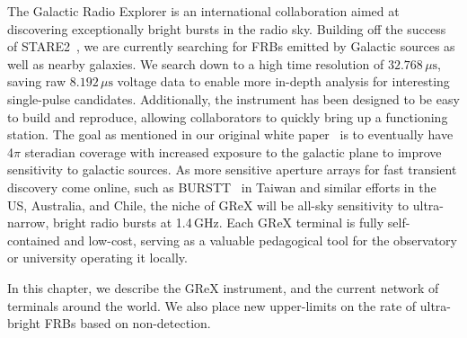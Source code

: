 The Galactic Radio Explorer is an international collaboration aimed at discovering exceptionally bright bursts in the radio sky.
Building off the success of STARE2~\cite{bochenekSTARE2DetectingFast2020}, we are currently searching for FRBs emitted by Galactic sources as well as nearby galaxies.
We search down to a high time resolution of $32.768\,\mu\text{s}$, saving raw $8.192\,\mu\text{s}$ voltage data to enable more in-depth analysis for interesting single-pulse candidates.
Additionally, the instrument has been designed to be easy to build and reproduce, allowing collaborators to quickly bring up a functioning station.
The goal as mentioned in our original white paper~\cite{connorGalacticRadioExplorer2021a} is to eventually have 4$\pi$ steradian coverage with increased exposure to the galactic plane to improve sensitivity to galactic sources.
As more sensitive aperture arrays for fast transient discovery come online, such as BURSTT~\cite{linBURSTTBustlingUniverse2022} in Taiwan and similar efforts in the US, Australia, and Chile, the niche of GReX will be all-sky 
sensitivity to ultra-narrow, bright radio bursts at 1.4\,GHz.
Each GReX terminal is fully self-contained and low-cost, serving as a valuable pedagogical tool for the observatory or university operating it locally.

In this chapter, we describe the GReX instrument, and the current network of terminals around the world. We also place new upper-limits on the rate of ultra-bright FRBs based on non-detection.
